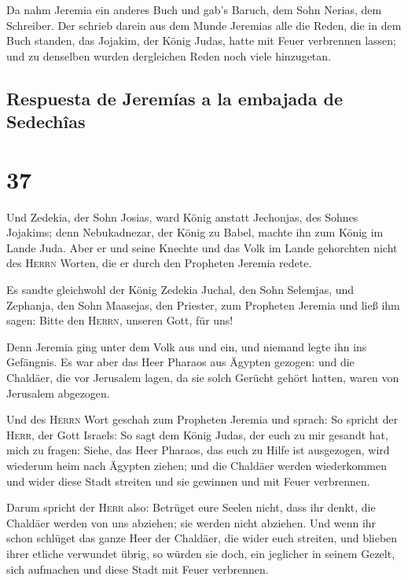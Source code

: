  Da nahm Jeremia ein anderes Buch und gab's Baruch, dem
Sohn Nerias, dem Schreiber. Der schrieb darein aus dem Munde Jeremias
alle die Reden, die in dem Buch standen, das Jojakim, der König Judas,
hatte mit Feuer verbrennen lassen; und zu denselben wurden dergleichen
Reden noch viele hinzugetan.

\hypertarget{respuesta-de-jeremuxedas-a-la-embajada-de-sedechuxeeas}{%
\subsection{Respuesta de Jeremías a la embajada de
Sedechîas}\label{respuesta-de-jeremuxedas-a-la-embajada-de-sedechuxeeas}}

\hypertarget{section-36}{%
\section{37}\label{section-36}}

 Und Zedekia, der Sohn Josias, ward König anstatt
Jechonjas, des Sohnes Jojakims; denn Nebukadnezar, der König zu Babel,
machte ihn zum König im Lande Juda.  Aber er und seine
Knechte und das Volk im Lande gehorchten nicht des \textsc{Herrn}
Worten, die er durch den Propheten Jeremia redete.

 Es sandte gleichwohl der König Zedekia Juchal, den Sohn
Selemjas, und Zephanja, den Sohn Maasejas, den Priester, zum Propheten
Jeremia und ließ ihm sagen: Bitte den \textsc{Herrn}, unseren Gott, für
uns!

 Denn Jeremia ging unter dem Volk aus und ein, und niemand
legte ihn ins Gefängnis.  Es war aber das Heer Pharaos aus
Ägypten gezogen: und die Chaldäer, die vor Jerusalem lagen, da sie solch
Gerücht gehört hatten, waren von Jerusalem abgezogen.

 Und des \textsc{Herrn} Wort geschah zum Propheten Jeremia
und sprach:  So spricht der \textsc{Herr}, der Gott
Israels: So sagt dem König Judas, der euch zu mir gesandt hat, mich zu
fragen: Siehe, das Heer Pharaos, das euch zu Hilfe ist ausgezogen, wird
wiederum heim nach Ägypten ziehen;  und die Chaldäer
werden wiederkommen und wider diese Stadt streiten und sie gewinnen und
mit Feuer verbrennen.

 Darum spricht der \textsc{Herr} also: Betrüget eure
Seelen nicht, dass ihr denkt, die Chaldäer werden von uns abziehen; sie
werden nicht abziehen.  Und wenn ihr schon schlüget das
ganze Heer der Chaldäer, die wider euch streiten, und blieben ihrer
etliche verwundet übrig, so würden sie doch, ein jeglicher in seinem
Gezelt, sich aufmachen und diese Stadt mit Feuer verbrennen.


